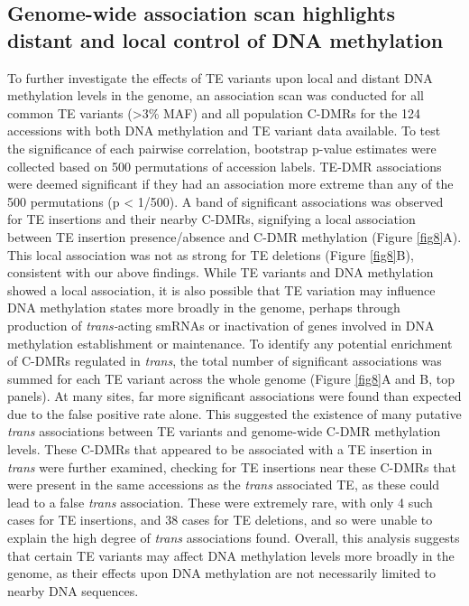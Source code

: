 \documentclass[12pt]{article}
\begin{document}
\subsection{Genome-wide association scan highlights distant and local
control of DNA methylation}

To further investigate the effects of TE variants upon local and
distant DNA methylation levels in the genome, an association scan was
conducted for all common TE variants (\textgreater{}3\% MAF) and all
population C-DMRs for the 124 accessions with both DNA methylation and
TE variant data available. To test the significance of each pairwise
correlation, bootstrap p-value estimates were collected based on 500
permutations of accession labels. TE-DMR associations were deemed
significant if they had an association more extreme than any of the
500 permutations (p \textless{} 1/500). A band of significant
associations was observed for TE insertions and their nearby C-DMRs,
signifying a local association between TE insertion presence/absence
and C-DMR methylation (Figure \ref{fig8}A).  This local association
was not as strong for TE deletions (Figure \ref{fig8}B), consistent
with our above findings. While TE variants and DNA methylation showed
a local association, it is also possible that TE variation may
influence DNA methylation states more broadly in the genome, perhaps
through production of \emph{trans-}acting smRNAs or inactivation of
genes involved in DNA methylation establishment or maintenance. To
identify any potential enrichment of C-DMRs regulated in \emph{trans},
the total number of significant associations was summed for each TE
variant across the whole genome (Figure \ref{fig8}A and B, top
panels). At many sites, far more significant associations were found
than expected due to the false positive rate alone. This suggested the
existence of many putative \emph{trans }associations between TE
variants and genome-wide C-DMR methylation levels. These C-DMRs that
appeared to be associated with a TE insertion in \emph{trans} were
further examined, checking for TE insertions near these C-DMRs that
were present in the same accessions as the \emph{trans }associated TE,
as these could lead to a false \emph{trans }association. These were
extremely rare, with only 4 such cases for TE insertions, and 38 cases
for TE deletions, and so were unable to explain the high degree of
\emph{trans }associations found. Overall, this analysis suggests that
certain TE variants may affect DNA methylation levels more broadly in
the genome, as their effects upon DNA methylation are not necessarily
limited to nearby DNA sequences.
\end{document}
